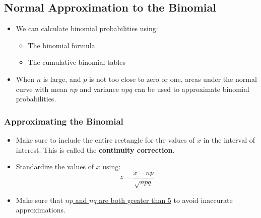 \documentclass[12pt, letterpaper]{article}
\begin{document}
        \subsection{Normal Approximation to the Binomial}
            \begin{itemize}
                \item We can calculate binomial probabilities using:
                \begin{itemize}
                    \item The binomial formula
                    \item The cumulative binomial tables
                \end{itemize}
                \item When $n$ is large, and $p$ is not too close to zero or one, areas under the normal curve with mean $np$ and variance $npq$ can be used to approximate binomial probabilities.
            \end{itemize}
            \subsubsection{Approximating the Binomial}
                \begin{itemize}
                    \item Make sure to include the entire rectangle for the values of $x$ in the interval of interest. This is called the \textbf{continuity correction}.
                    \item Standardize the values of $x$ using:
                    \begin{equation}
                        z = \frac{x - np}{\sqrt{npq}}
                    \end{equation}
                    \item Make sure that \underline{$np$ and $nq$ are both greater than 5} to avoid inaccurate approximations.
                \end{itemize}
\end{document}
